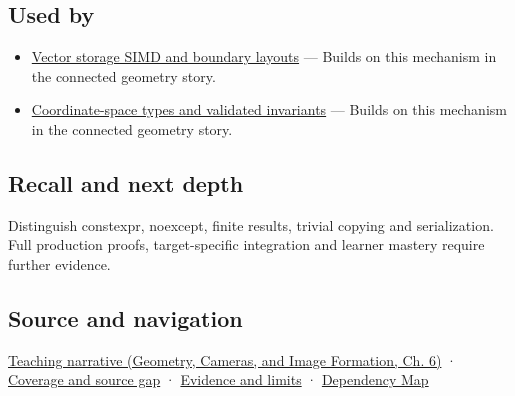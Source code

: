 \subsection{Used by}\label{appendix-37a39984ba66-used-by}

\hypertarget{appendix-37a39984ba66-used-by}{}

\begin{itemize}
\tightlist
\item
  \hyperref[appendix-26bf6bf2fb8b]{Vector storage SIMD and boundary layouts} --- Builds on this mechanism in the connected geometry story.
\item
  \hyperref[appendix-380a220e2529]{Coordinate-space types and validated invariants} --- Builds on this mechanism in the connected geometry story.
\end{itemize}

\subsection{Recall and next depth}\label{appendix-37a39984ba66-recall-and-next-depth}

\hypertarget{appendix-37a39984ba66-recall-and-next-depth}{}

Distinguish constexpr, noexcept, finite results, trivial copying and serialization. Full production proofs, target-specific integration and learner mastery require further evidence.

\subsection{Source and navigation}\label{appendix-37a39984ba66-source-and-navigation}

\hypertarget{appendix-37a39984ba66-source-and-navigation}{}

\href{../03-Geometry-Cameras-and-Image-Formation/main.pdf\#nameddest=02-foundations-ii-ch037-three-stored-numbers-are-not-the-complete-contract}{Teaching narrative (Geometry, Cameras, and Image Formation, Ch. 6)} · \hyperref[appendix-fd090d982a15-phase-6---parts-501-600]{Coverage and source gap} · \hyperref[appendix-a103e7846d21-phase-6---source-analysis-and-verification]{Evidence and limits} · \hyperref[appendix-4ad47bdd269a]{Dependency Map}
